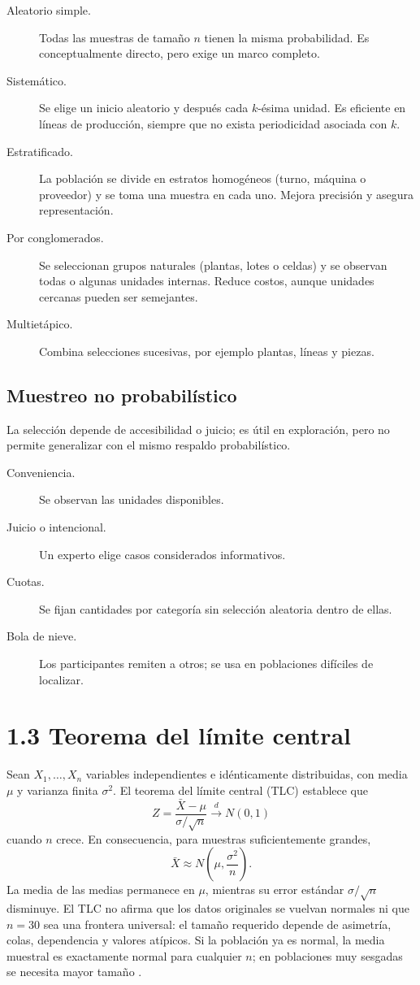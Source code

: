 \begin{description}
  \item[Aleatorio simple.] Todas las muestras de tamaño $n$ tienen la misma probabilidad. Es conceptualmente directo, pero exige un marco completo.
  \item[Sistemático.] Se elige un inicio aleatorio y después cada $k$-ésima unidad. Es eficiente en líneas de producción, siempre que no exista periodicidad asociada con $k$.
  \item[Estratificado.] La población se divide en estratos homogéneos (turno, máquina o proveedor) y se toma una muestra en cada uno. Mejora precisión y asegura representación.
  \item[Por conglomerados.] Se seleccionan grupos naturales (plantas, lotes o celdas) y se observan todas o algunas unidades internas. Reduce costos, aunque unidades cercanas pueden ser semejantes.
  \item[Multietápico.] Combina selecciones sucesivas, por ejemplo plantas, líneas y piezas.
\end{description}

\subsection*{Muestreo no probabilístico}
La selección depende de accesibilidad o juicio; es útil en exploración, pero no permite generalizar con el mismo respaldo probabilístico.

\begin{description}
  \item[Conveniencia.] Se observan las unidades disponibles.
  \item[Juicio o intencional.] Un experto elige casos considerados informativos.
  \item[Cuotas.] Se fijan cantidades por categoría sin selección aleatoria dentro de ellas.
  \item[Bola de nieve.] Los participantes remiten a otros; se usa en poblaciones difíciles de localizar.
\end{description}

\section{1.3 Teorema del límite central}
Sean $X_1,\ldots,X_n$ variables independientes e idénticamente distribuidas, con media $\mu$ y varianza finita $\sigma^2$. El teorema del límite central (TLC) establece que
\[
  Z=\frac{\bar X-\mu}{\sigma/\sqrt n}\xrightarrow{d}N(0,1)
\]
cuando $n$ crece. En consecuencia, para muestras suficientemente grandes,
\[
  \bar X\approx N\!\left(\mu,\frac{\sigma^2}{n}\right).
\]
La media de las medias permanece en $\mu$, mientras su error estándar $\sigma/\sqrt n$ disminuye. El TLC no afirma que los datos originales se vuelvan normales ni que $n=30$ sea una frontera universal: el tamaño requerido depende de asimetría, colas, dependencia y valores atípicos. Si la población ya es normal, la media muestral es exactamente normal para cualquier $n$; en poblaciones muy sesgadas se necesita mayor tamaño \citep{openstax2023,nistNormal}.

